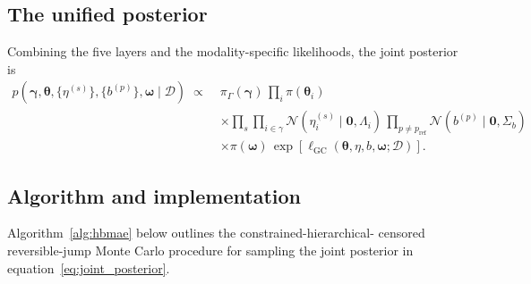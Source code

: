 \documentclass[12pt]{article}
\theoremstyle{plain}
\theoremstyle{definition}
\theoremstyle{remark}
\begin{document}
\subsection{The unified posterior}\label{sec:framework:posterior}

Combining the five layers and the modality-specific likelihoods, the joint
posterior is
%
\begin{equation}
\begin{split}
  p(\boldsymbol\gamma, \boldsymbol\theta, \{\eta^{(s)}\}, \{b^{(p)}\},
    \boldsymbol\omega \mid \mathcal{D})
  \;\propto\; & \pi_\Gamma(\boldsymbol\gamma)\,
                 \prod_{i} \pi(\boldsymbol\theta_i) \\
              & \times \prod_{s} \prod_{i\in\gamma} \mathcal{N}(\eta_i^{(s)} \mid \mathbf{0}, \Lambda_i)\,
                 \prod_{p\ne p_{\mathrm{ref}}} \mathcal{N}(b^{(p)} \mid \mathbf{0}, \Sigma_b) \\
              & \times \pi(\boldsymbol\omega)\,
                 \exp\!\left[\ell_{\mathrm{GC}}(\boldsymbol\theta,\eta,b,\boldsymbol\omega;\mathcal{D})\right].
\end{split}
\label{eq:joint_posterior}
\end{equation}

\subsection{Algorithm and implementation}\label{sec:framework:algorithm}

Algorithm~\ref{alg:hbmae} below outlines the constrained-hierarchical-
censored reversible-jump Monte Carlo procedure for sampling the joint
posterior in equation~\eqref{eq:joint_posterior}.
\end{document}
